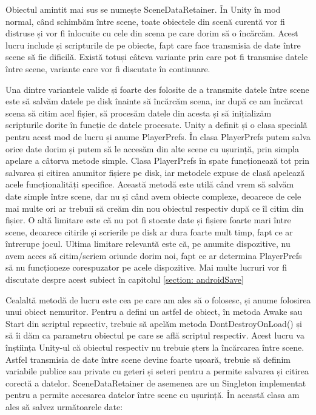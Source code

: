\documentclass[12pt, a4paper]{article}
\begin{document}
	Obiectul amintit mai sus se numește SceneDataRetainer. În Unity în mod normal, când schimbăm între scene, toate obiectele din scenă curentă vor fi distruse și vor fi înlocuite cu cele din scena pe care dorim să o încărcăm. Acest lucru include și scripturile de pe obiecte, fapt care face transmisia de date între scene să fie dificilă. Există totuși câteva variante prin care pot fi transmise datele între scene, variante care vor fi discutate în continuare.
	\newline
	
	Una dintre variantele valide și foarte des folosite de a transmite datele între scene este să salvăm datele pe disk înainte să încărcăm scena, iar după ce am încărcat scena să citim acel fișier, să procesăm datele din acesta și să inițializăm scripturile dorite în funcție de datele procesate. Unity a definit și o clasa specială pentru acest mod de lucru și anume PlayerPrefs. În clasa PlayerPrefs putem salva orice date dorim și putem să le accesăm din alte scene cu ușurință, prin simpla apelare a câtorva metode simple. Clasa PlayerPrefs în spate funcționează tot prin salvarea și citirea anumitor fișiere pe disk, iar metodele expuse de clasă apelează acele funcționalități specifice. Această metodă este utilă când vrem să salvăm date simple între scene, dar nu și când avem obiecte complexe, deoarece de cele mai multe ori ar trebuii să creăm din nou obiectul respectiv după ce îl citim din fișier. O altă limitare este că nu pot fi stocate date și fișiere foarte mari între scene, deoarece citirile și scrierile pe disk ar dura foarte mult timp, fapt ce ar întrerupe jocul. Ultima limitare relevantă este că, pe anumite dispozitive, nu avem acces să citim/scriem oriunde dorim noi, fapt ce ar determina PlayerPrefs să nu funcționeze corespuzator pe acele dispozitive. Mai multe lucruri vor fi discutate despre acest subiect în capitolul \ref{section: androidSave}
	\newline
	
	Cealaltă metodă de lucru este cea pe care am ales să o folosesc, și anume folosirea unui obiect nemuritor. Pentru a defini un astfel de obiect, în metoda Awake sau Start din scriptul repsectiv, trebuie să apelăm metoda DontDestroyOnLoad() și să îi dăm ca parametru obiectul pe care se află scriptul respectiv. Acest lucru va înștiința Unity-ul că obiectul respectiv nu trebuie șters la încărcarea între scene. Astfel transmisia de date între scene devine foarte ușoară, trebuie să definim variabile publice sau private cu geteri și seteri pentru a permite salvarea și citirea corectă a datelor. SceneDataRetainer de asemenea are un Singleton implementat pentru a permite accesarea datelor între scene cu ușurință. În această clasa am ales să salvez următoarele date:
	
\end{document}
